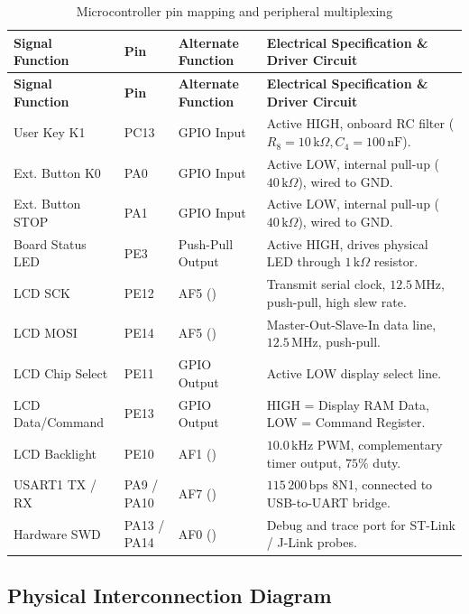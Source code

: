 \begingroup
\small
\setlength{\tabcolsep}{3.5pt}
\renewcommand{\arraystretch}{1.18}
\begin{longtable}{L{3.3cm}C{1.8cm}L{2.6cm}L{7.0cm}}
  \caption{Microcontroller pin mapping and peripheral multiplexing}\label{tab:pins}\\
  \toprule
  \textbf{Signal Function} & \textbf{Pin} & \textbf{Alternate Function} & \textbf{Electrical Specification \& Driver Circuit} \\
  \midrule
  \endfirsthead
  \toprule
  \textbf{Signal Function} & \textbf{Pin} & \textbf{Alternate Function} & \textbf{Electrical Specification \& Driver Circuit} \\
  \midrule
  \endhead
  \bottomrule
  \endfoot
  User Key K1 & PC13 & GPIO Input & Active HIGH, onboard RC filter ($R_8 = 10\,\text{k}\Omega, C_4 = 100\,\text{nF}$). \\
  Ext. Button K0 & PA0 & GPIO Input & Active LOW, internal pull-up ($40\,\text{k}\Omega$), wired to GND. \\
  Ext. Button STOP & PA1 & GPIO Input & Active LOW, internal pull-up ($40\,\text{k}\Omega$), wired to GND. \\
  Board Status LED & PE3 & Push-Pull Output & Active HIGH, drives physical LED through $1\,\text{k}\Omega$ resistor. \\
  LCD SCK & PE12 & AF5 () & Transmit serial clock, $12.5\,\text{MHz}$, push-pull, high slew rate. \\
  LCD MOSI & PE14 & AF5 () & Master-Out-Slave-In data line, $12.5\,\text{MHz}$, push-pull. \\
  LCD Chip Select & PE11 & GPIO Output & Active LOW display select line. \\
  LCD Data/Command & PE13 & GPIO Output & HIGH = Display RAM Data, LOW = Command Register. \\
  LCD Backlight & PE10 & AF1 () & $10.0\,\text{kHz}$ PWM, complementary timer output, $75\%$ duty. \\
  USART1 TX / RX & PA9 / PA10 & AF7 () & $115\,200\,\text{bps}$ 8N1, connected to USB-to-UART bridge. \\
  Hardware SWD & PA13 / PA14 & AF0 () & Debug and trace port for ST-Link / J-Link probes. \\
\end{longtable}
\endgroup

\subsection{Physical Interconnection Diagram}

